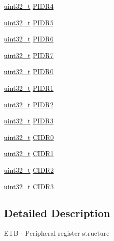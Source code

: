 \begin{DoxyCompactItemize}
\item 
\hyperlink{_p_e___types_8h_a33594304e786b158f3fb30289278f5af}{uint32\+\_\+t} \hyperlink{struct_e_t_b___mem_map_aab4e4aba29d9ec426e0f2e218903a4f0}{P\+I\+D\+R4}
\item 
\hyperlink{_p_e___types_8h_a33594304e786b158f3fb30289278f5af}{uint32\+\_\+t} \hyperlink{struct_e_t_b___mem_map_a29dbd40dd92aaf2fc1674f9f38ef1a5e}{P\+I\+D\+R5}
\item 
\hyperlink{_p_e___types_8h_a33594304e786b158f3fb30289278f5af}{uint32\+\_\+t} \hyperlink{struct_e_t_b___mem_map_aa7b42abfbe48ecbae7727e614304f2e5}{P\+I\+D\+R6}
\item 
\hyperlink{_p_e___types_8h_a33594304e786b158f3fb30289278f5af}{uint32\+\_\+t} \hyperlink{struct_e_t_b___mem_map_afe2e7e50c2713a52cce9a89e6dcb0e1c}{P\+I\+D\+R7}
\item 
\hyperlink{_p_e___types_8h_a33594304e786b158f3fb30289278f5af}{uint32\+\_\+t} \hyperlink{struct_e_t_b___mem_map_a7cca8cc873dc51b739a8f2a26b01cd22}{P\+I\+D\+R0}
\item 
\hyperlink{_p_e___types_8h_a33594304e786b158f3fb30289278f5af}{uint32\+\_\+t} \hyperlink{struct_e_t_b___mem_map_a608af25e75d3f8e98b484e53c286aaed}{P\+I\+D\+R1}
\item 
\hyperlink{_p_e___types_8h_a33594304e786b158f3fb30289278f5af}{uint32\+\_\+t} \hyperlink{struct_e_t_b___mem_map_a29cf14afb49d11bc1c1ab4df4b9b23f5}{P\+I\+D\+R2}
\item 
\hyperlink{_p_e___types_8h_a33594304e786b158f3fb30289278f5af}{uint32\+\_\+t} \hyperlink{struct_e_t_b___mem_map_aca8df6dc059f2ca8eb432f2f74a09149}{P\+I\+D\+R3}
\item 
\hyperlink{_p_e___types_8h_a33594304e786b158f3fb30289278f5af}{uint32\+\_\+t} \hyperlink{struct_e_t_b___mem_map_a084d9f4d6b483f57a07d844cf1bf18d7}{C\+I\+D\+R0}
\item 
\hyperlink{_p_e___types_8h_a33594304e786b158f3fb30289278f5af}{uint32\+\_\+t} \hyperlink{struct_e_t_b___mem_map_afc0480cceefc94fc8b2e730bb04cfd4f}{C\+I\+D\+R1}
\item 
\hyperlink{_p_e___types_8h_a33594304e786b158f3fb30289278f5af}{uint32\+\_\+t} \hyperlink{struct_e_t_b___mem_map_a21c4d78f89b6495cdcd781c34f483f42}{C\+I\+D\+R2}
\item 
\hyperlink{_p_e___types_8h_a33594304e786b158f3fb30289278f5af}{uint32\+\_\+t} \hyperlink{struct_e_t_b___mem_map_a54c5d31e149764075338797e0705a826}{C\+I\+D\+R3}
\end{DoxyCompactItemize}


\subsection{Detailed Description}
E\+TB -\/ Peripheral register structure 

